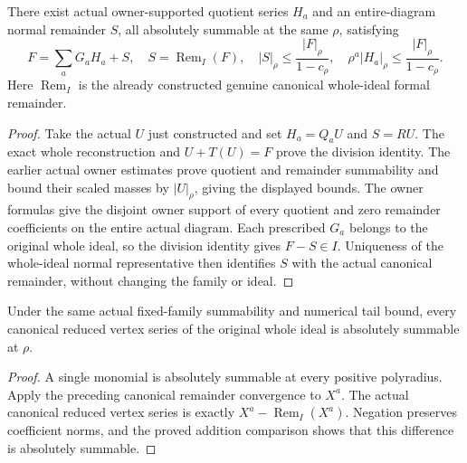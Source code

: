 \begin{theorem}
\label{hir:actual-vertex-convergent-whole-division}
\leanok
There exist actual owner-supported quotient series $H_a$ and an entire-diagram normal remainder $S$, all absolutely summable at the same $\rho$, satisfying
\[
 F=\sum_aG_aH_a+S,
 \quad S=\operatorname{Rem}_I(F),
 \quad |S|_\rho\le\frac{|F|_\rho}{1-c_\rho},
 \quad \rho^a|H_a|_\rho\le\frac{|F|_\rho}{1-c_\rho}.
\]
Here $\operatorname{Rem}_I$ is the already constructed genuine canonical whole-ideal formal remainder.
\end{theorem}
\begin{proof}
Take the actual $U$ just constructed and set $H_a=Q_aU$ and $S=RU$. The exact whole reconstruction and $U+T(U)=F$ prove the division identity. The earlier actual owner estimates prove quotient and remainder summability and bound their scaled masses by $|U|_\rho$, giving the displayed bounds. The owner formulas give the disjoint owner support of every quotient and zero remainder coefficients on the entire actual diagram. Each prescribed $G_a$ belongs to the original whole ideal, so the division identity gives $F-S\in I$. Uniqueness of the whole-ideal normal representative then identifies $S$ with the actual canonical remainder, without changing the family or ideal.
\end{proof}

\begin{theorem}
\label{hir:actual-reduced-vertex-absolute-convergence}
\leanok
Under the same actual fixed-family summability and numerical tail bound, every canonical reduced vertex series of the original whole ideal is absolutely summable at $\rho$.
\end{theorem}
\begin{proof}
A single monomial is absolutely summable at every positive polyradius. Apply the preceding canonical remainder convergence to $X^a$. The actual canonical reduced vertex series is exactly $X^a-\operatorname{Rem}_I(X^a)$. Negation preserves coefficient norms, and the proved addition comparison shows that this difference is absolutely summable.
\end{proof}

